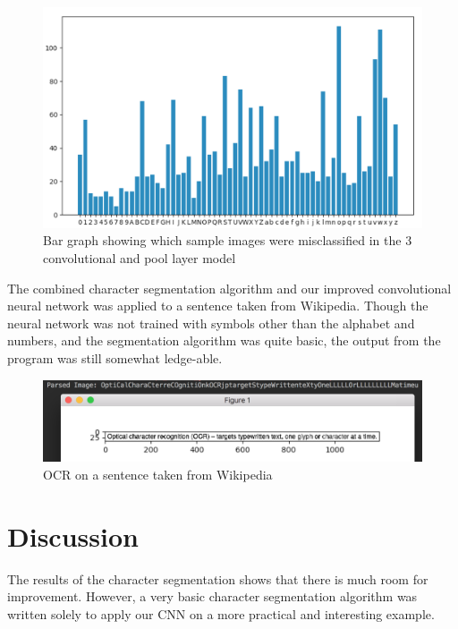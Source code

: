 \documentclass[11pt]{article}
\begin{document}
\begin{figure}
    \centering
    \includegraphics[scale=0.4]{model_2_errors.png}
    \caption{Bar graph showing which sample images were misclassified in the 3 convolutional and pool layer model}
    \label{fig:model_2_error}
\end{figure}

The combined character segmentation algorithm and our improved convolutional neural network was applied to a sentence taken from Wikipedia. \cite{ocr_wiki_2017} Though the neural network was not trained with symbols other than the alphabet and numbers, and the segmentation algorithm was quite basic, the output from the program was still somewhat ledge-able.

\begin{figure}
    \centering
    \includegraphics[scale=0.6]{sentence.png}
    \caption{OCR on a sentence taken from Wikipedia}
    \label{fig:sentence_ocr}
\end{figure}

\section{Discussion}

The results of the character segmentation shows that there is much room for improvement. However, a very basic character segmentation algorithm was written solely to apply our CNN on a more practical and interesting example.
\end{document}
